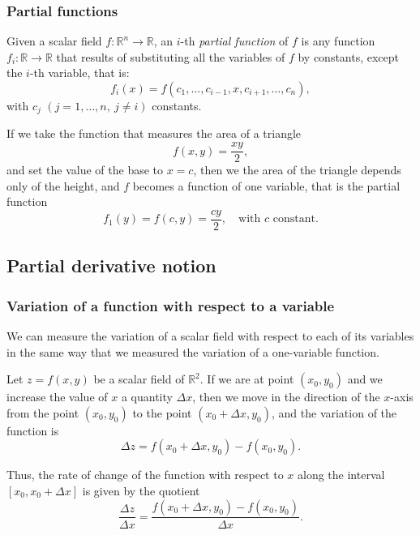 \begin{frame}
\frametitle{Partial functions}
\begin{definition}
Given a scalar field $f:\mathbb{R}^n\rightarrow \mathbb{R}$, an $i$-th \emph{partial function} of $f$ is any function $f_i:\mathbb{R}\rightarrow \mathbb{R}$ that results of substituting all the variables of $f$ by constants, except the $i$-th variable, that is:
\[
f_i(x)=f(c_1,\ldots,c_{i-1},x,c_{i+1},\ldots,c_{n}),
\]
with $c_j$ $(j=1,\ldots, n,\ j\neq i)$ constants.
\end{definition}

If we take the function that measures the area of a triangle
\[f(x,y)=\frac{xy}{2},\]
and set the value of the base to $x=c$, then we the area of the triangle depends only of the height, and $f$ becomes a function of one variable, that is the partial function
\[
f_1(y)=f(c,y)=\frac{cy}{2},\quad \mbox{with $c$ constant}.
\]
\end{frame}



\subsection{Partial derivative notion}
\begin{frame}
\frametitle{Variation of a function with respect to a variable}
We can measure the variation of a scalar field with respect to each of its variables in the same way that we measured the variation of a one-variable function.

Let $z=f(x,y)$ be a scalar field of $\mathbb{R}^2$.
If we are at point $(x_0,y_0)$ and we increase the value of $x$ a quantity $\Delta x$, then we move in the direction of the $x$-axis from the point $(x_0,y_0)$ to the point $(x_0+\Delta x,y_0)$, and the variation of the function is
\[
\Delta z=f(x_0+\Delta x,y_0)-f (x_0,y_0).
\]

Thus, the rate of change of the function with respect to $x$ along the interval $[x_0,x_0+\Delta x]$ is given by the quotient
\[\frac{\Delta z}{\Delta x}=\frac{f(x_0+\Delta x,y_0)-f(x_0,y_0)}{\Delta x}.\]
\end{frame}


